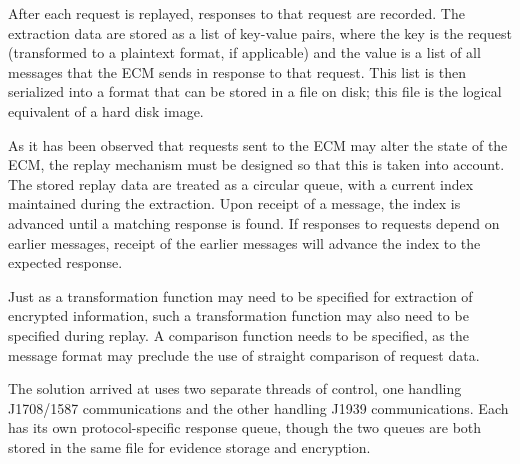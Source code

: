 After each request is replayed, responses to that request are recorded. The extraction data are stored as a list of 
key-value pairs, where the key is the request (transformed to a plaintext format, if applicable) and the value is
a list of all messages that the ECM sends in response to that request. This list is then serialized into a format
that can be stored in a file on disk; this file is the logical equivalent of a hard disk image.

As it has been observed that requests sent to the ECM may alter the state of the ECM, the replay mechanism must
be designed so that this is taken into account. The stored replay data are treated as a circular queue, with a current
index maintained during the extraction. Upon receipt of a message, the index is advanced until a matching response is found.
If responses to requests depend on earlier messages, receipt of the earlier messages will advance the index to
the expected response.


Just as a transformation function may need to be specified for extraction of encrypted information, such a transformation
function may also need to be specified during replay. A comparison function needs to be specified, as the message format may
preclude the use of straight comparison of request data.

The solution arrived at uses two separate threads of control, one handling J1708/1587 communications and the other
handling J1939 communications. Each has its own protocol-specific response queue, though the two queues are both
stored in the same file for evidence storage and encryption.



